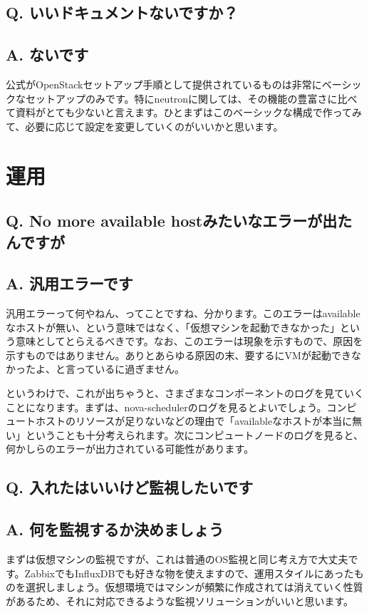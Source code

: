 \documentclass[9pt,b5paper,tombo,openany]{jsbook}
\begin{document}
\subsection*{{\LARGE\bfseries Q.} いいドキュメントないですか？}
\subsection*{{\LARGE\bfseries A.} ないです}
公式がOpenStackセットアップ手順として提供されているものは非常にベーシックなセットアップのみです。特にneutronに関しては、その機能の豊富さに比べて資料がとても少ないと言えます。ひとまずはこのベーシックな構成で作ってみて、必要に応じて設定を変更していくのがいいかと思います。

\section{運用}

\subsection*{{\LARGE\bfseries Q.} No more available hostみたいなエラーが出たんですが}
\subsection*{{\LARGE\bfseries A.} 汎用エラーです}
汎用エラーって何やねん、ってことですね、分かります。このエラーはavailableなホストが無い、という意味ではなく、「仮想マシンを起動できなかった」という意味としてとらえるべきです。なお、このエラーは現象を示すもので、原因を示すものではありません。ありとあらゆる原因の末、要するにVMが起動できなかったよ、と言っているに過ぎません。

というわけで、これが出ちゃうと、さまざまなコンポーネントのログを見ていくことになります。まずは、nova-schedulerのログを見るとよいでしょう。コンピュートホストのリソースが足りないなどの理由で「availableなホストが本当に無い」ということも十分考えられます。次にコンピュートノードのログを見ると、何かしらのエラーが出力されている可能性があります。

\subsection*{{\LARGE\bfseries Q.} 入れたはいいけど監視したいです}
\subsection*{{\LARGE\bfseries A.} 何を監視するか決めましょう}
まずは仮想マシンの監視ですが、これは普通のOS監視と同じ考え方で大丈夫です。ZabbixでもInfluxDBでも好きな物を使えますので、運用スタイルにあったものを選択しましょう。仮想環境ではマシンが頻繁に作成されては消えていく性質があるため、それに対応できるような監視ソリューションがいいと思います。
\end{document}
